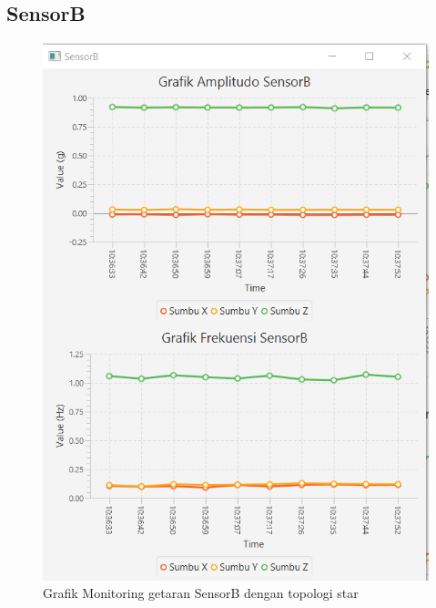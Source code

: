 \subsection{SensorB}
\begin{figure}[H] 
	\centering  
	\includegraphics[scale=1]{Lampiran/HasilPengujian/sensorB_starRooftop2.PNG} 
	\caption[Grafik Monitoring getaran SensorB dengan topologi star]{Grafik Monitoring getaran SensorB dengan topologi star}
	\label{fig:grafik_B_star_rooftop} 
\end{figure}

